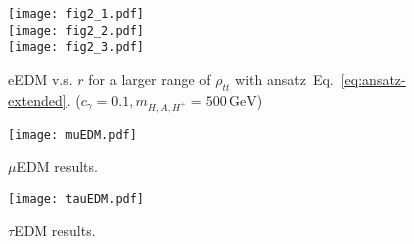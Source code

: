 \begin{figure}[p]
    \centering
    \texttt{[image: fig2\_1.pdf]}\\
    \texttt{[image: fig2\_2.pdf]}\\
    \texttt{[image: fig2\_3.pdf]}
    \caption{eEDM v.s. \(r \) for a larger range of \(\rho_{tt} \) with ansatz~Eq.~\eqref{eq:ansatz-extended}. (\(c_{\gamma} = 0.1, m_{H, A, H^+} = 500\,\mathrm{GeV} \))}
    \label{fig:eEDM}
\end{figure}

\begin{figure}[p]
    \centering
    \texttt{[image: muEDM.pdf]}
    \caption{\(\mu \)EDM results.}
    \label{fig:muEDM}
\end{figure}

\begin{figure}[p]
    \centering
    \texttt{[image: tauEDM.pdf]}
    \caption{\(\tau \)EDM results.}
    \label{fig:tauEDM}
\end{figure}